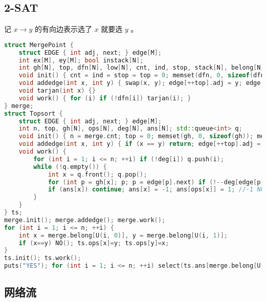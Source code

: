 \documentclass[landscape,a4paper]{article}
\begin{document}
\subsection{2-SAT}

记 $x \rightarrow y$ 的有向边表示选了 $x$ 就要选 $y$ 。

\begin{lstlisting}[language=C++]
struct MergePoint {
	struct EDGE { int adj, next; } edge[M];
	int ex[M], ey[M]; bool instack[N];
	int gh[N], top, dfn[N], low[N], cnt, ind, stop, stack[N], belong[N];
	void init() { cnt = ind = stop = top = 0; memset(dfn, 0, sizeof(dfn)); memset(instack, 0, sizeof(instack)); memset(gh, 0, sizeof(gh)); }
	void addedge(int x, int y) { swap(x, y); edge[++top].adj = y; edge[top].next = gh[x]; gh[x] = top; ex[top] = x; ey[top] = y; }
	void tarjan(int x) {}
	void work() { for (i) if (!dfn[i]) tarjan(i); }
} merge; 
struct Topsort {
	struct EDGE { int adj, next; } edge[M];
	int n, top, gh[N], ops[N], deg[N], ans[N]; std::queue<int> q;
	void init() { n = merge.cnt; top = 0; memset(gh, 0, sizeof(gh)); memset(deg, 0, sizeof(deg)); }
	void addedge(int x, int y) { if (x == y) return; edge[++top].adj = y; edge[top].next = gh[x]; gh[x] = top; ++deg[y]; }
	void work() {
		for (int i = 1; i <= n; ++i) if (!deg[i]) q.push(i);
		while (!q.empty()) {
			int x = q.front(); q.pop();
			for (int p = gh[x]; p; p = edge[p].next) if (!--deg[edge[p].adj]) q.push(edge[p].adj);
			if (ans[x]) continue; ans[x] = -1; ans[ops[x]] = 1; //-1 NO, 1 YES
		}
	}
} ts;
merge.init(); merge.addedge(); merge.work();
for (int i = 1; i <= n; ++i) {
	int x = merge.belong[U(i, 0)], y = merge.belong[U(i, 1)];
	if (x==y) NO(); ts.ops[x]=y; ts.ops[y]=x;
}
ts.init(); ts.work();
puts("YES"); for (int i = 1; i <= n; ++i) select(ts.ans[merge.belong[U(i,1)] == 1);
\end{lstlisting}

\subsection{网络流}
\end{document}

